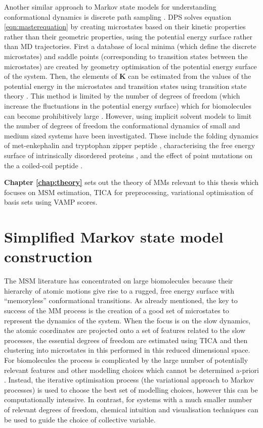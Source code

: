 Another similar approach to Markov state models  for understanding conformational dynamics is discrete path sampling \cite{walesEnergyLandscapesCalculating2006}. DPS solves equation \ref{eqn:masterequation} by creating  microstates based on their kinetic properties rather than their geometric properties, using the potential energy surface rather than MD trajectories. First a database of local minima (which define the discrete microstates) and saddle points (corresponding to transition states between the microstates) are created by geometry optimisation of the potential energy surface of the system. Then, the elements of $\mathbf{K}$ can be estimated from the values of the potential energy in the microstates and transition states using transition state theory \cite{wales_2004}. This method is limited by the number of degrees of freedom (which increase the fluctuations in the potential energy surface) which for biomolecules can become prohibitively large \cite{noeTransitionNetworksModeling2008}. However, using implicit solvent models to limit the number of degrees of freedom the conformational dynamics of small and medium sized systems have been investigated. These include the folding dynamics of met-enkephalin \cite{evansFreeEnergyLandscape2003a} and tryptophan zipper peptide \cite{josephStructureThermodynamicsFolding2016}, characterising the free energy surface of intrinsically disordered proteins 
\cite{josephIntrinsicallyDisorderedLandscapes2018}, and the effect of point mutations on the a coiled-coil peptide \cite{roderTransformingEnergyLandscape2017}. 

\textbf{Chapter \ref{chap:theory}} sets out the theory of MMs relevant to this thesis which focuses on MSM estimation, TICA for preprocessing, variational optimisation of basis sets using VAMP scores. 


\section{Simplified Markov state model construction}
 The MSM literature has concentrated on large biomolecules because their hierarchy of atomic motions \cite{frauenfelderEnergyLandscapesMotions1991} give rise to a rugged, free energy surface with ``memoryless'' conformational transitions. As already mentioned, the key to success of the MM process is the creation of a good set of microstates to represent the dynamics of the system. When the focus is on the slow dynamics, the atomic coordinates are projected onto a set of features related to the slow processes, the essential degrees of freedom are estimated using TICA and then clustering into microstates in this performed in this reduced dimensional space. For biomolecules the process is complicated by the large number of potentially relevant features and other modelling choices which cannot be determined a-priori \cite{shallowayMacrostatesClassicalStochastic1996}. Instead, the iterative optimisation process (the variational approach to Markov processes) is used to choose the best set of modelling choices, however this can be computationally intensive.  In contrast, for systems with a much smaller number of relevant degrees of freedom, chemical intuition and  visualisation techniques can be used to guide the choice of collective variable.

